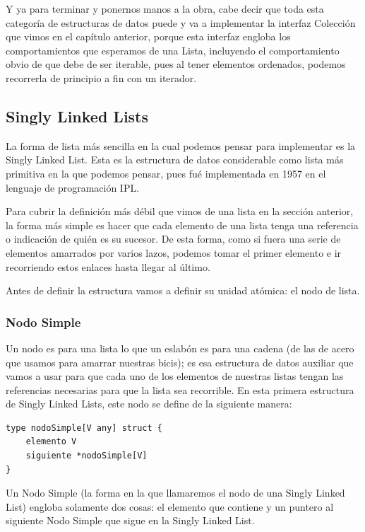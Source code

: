 \documentclass[11pt]{article}
\begin{document}
Y ya para terminar y ponernos manos a la obra, cabe decir que toda esta categoría de estructuras de datos puede y va a implementar la interfaz Colección que vimos en el capítulo anterior, porque esta interfaz engloba los comportamientos que esperamos de una Lista, incluyendo el comportamiento obvio de que debe de ser iterable, pues al tener elementos ordenados, podemos recorrerla de principio a fin con un iterador.
\subsection{Singly Linked Lists}
\label{sec:orge84c9b7}

La forma de lista más sencilla en la cual podemos pensar para implementar es la Singly Linked List. Esta es la estructura de datos considerable como lista más primitiva en la que podemos pensar, pues fué implementada en 1957 en el lenguaje de programación IPL.

Para cubrir la definición más débil que vimos de una lista en la sección anterior, la forma más simple es hacer que cada elemento de una lista tenga una referencia o indicación de quién es su sucesor. De esta forma, como si fuera una serie de elementos amarrados por varios lazos, podemos tomar el primer elemento e ir recorriendo estos enlaces hasta llegar al último.

Antes de definir la estructura vamos a definir su unidad atómica: el nodo de lista.
\subsubsection{Nodo Simple}
\label{sec:org9515cb5}

Un nodo es para una lista lo que un eslabón es para una cadena (de las de acero que usamos para amarrar nuestras bicis); es esa estructura de datos auxiliar que vamos a usar para que cada uno de los elementos de nuestras listas tengan las referencias necesarias para que la lista sea recorrible. En esta primera estructura de Singly Linked Lists, este nodo se define de la siguiente manera:

\begin{verbatim}
type nodoSimple[V any] struct {
	elemento V
	siguiente *nodoSimple[V]
}
\end{verbatim}

Un Nodo Simple (la forma en la que llamaremos el nodo de una Singly Linked List) engloba solamente dos cosas: el elemento que contiene y un puntero al siguiente Nodo Simple que sigue en la Singly Linked List.
\end{document}
